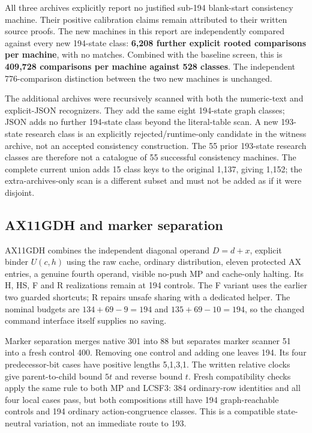 \documentclass[10pt,a4paper]{article}
\begin{document}
All three archives explicitly report no justified sub-194 blank-start consistency machine. Their positive calibration claims remain attributed to their written source proofs. The new machines in this report are independently compared against every new 194-state class: \textbf{6,208 further explicit rooted comparisons per machine}, with no matches. Combined with the baseline screen, this is \textbf{409,728 comparisons per machine against 528 classes}. The independent 776-comparison distinction between the two new machines is unchanged.

The additional archives were recursively scanned with both the numeric-text and explicit-JSON recognizers. They add the same eight 194-state graph classes; JSON adds no further 194-state class beyond the literal-table scan. A new 193-state research class is an explicitly rejected/runtime-only candidate in the witness archive, not an accepted consistency construction. The 55 prior 193-state research classes are therefore not a catalogue of 55 successful consistency machines. The complete current union adds 15 class keys to the original 1,137, giving 1,152; the extra-archives-only scan is a different subset and must not be added as if it were disjoint.

\subsection{AX11GDH and marker separation}\label{ax11gdh-and-marker-separation}

AX11GDH combines the independent diagonal operand \(D=d+x\), explicit binder \(U(c,h)\) using the raw cache, ordinary distribution, eleven protected AX entries, a genuine fourth operand, visible no-push MP and cache-only halting. Its H, HS, F and R realizations remain at 194 controls. The F variant uses the earlier two guarded shortcuts; R repairs unsafe sharing with a dedicated helper. The nominal budgets are \(134+69-9=194\) and \(135+69-10=194\), so the changed command interface itself supplies no saving.

Marker separation merges native 301 into 88 but separates marker scanner 51 into a fresh control 400. Removing one control and adding one leaves 194. Its four predecessor-bit cases have positive lengths 5,1,3,1. The written relative clocks give parent-to-child bound \(5t\) and reverse bound \(t\). Fresh compatibility checks apply the same rule to both MP and LCSF3: 384 ordinary-row identities and all four local cases pass, but both compositions still have 194 graph-reachable controls and 194 ordinary action-congruence classes. This is a compatible state-neutral variation, not an immediate route to 193.
\end{document}
